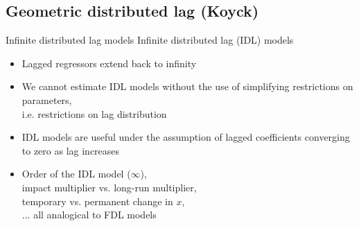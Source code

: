 \documentclass{beamer}
\begin{document}
\subsection{Geometric distributed lag (Koyck) }
\begin{frame}{Infinite distributed lag models}
Infinite distributed lag (IDL) models\\ \medskip
\begin{itemize}
\item Lagged regressors extend back to infinity
\item We cannot estimate IDL models without the use of simplifying restrictions on parameters, \\i.e. restrictions on lag distribution
\smallskip
\item IDL models are useful under the assumption of lagged coefficients converging to zero as lag increases
\smallskip
\item Order of the IDL model ($\infty$), 
\\impact multiplier vs. long-run multiplier, 
\\temporary vs. permanent change in $x$,
\\ $\dots$ all analogical to FDL models
\end{itemize}
\end{frame}
\end{document}
